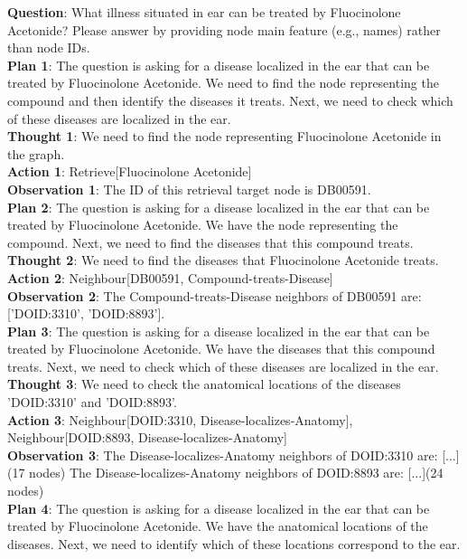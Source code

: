 \documentclass[11pt]{article}
\begin{document}
\begin{tcolorbox}[colback=white!10!white, colframe=blue!30!black, title=True Case (Biomedical), boxrule=1pt, fontupper={\fontsize{8pt}{10pt}\selectfont}]
\justifying
\noindent
\textbf{Question}: What illness situated in ear can be treated by Fluocinolone Acetonide? Please answer by providing node main feature (e.g., names) rather than node IDs. \\
\textbf{Plan 1}: The question is asking for a disease localized in the ear that can be treated by Fluocinolone Acetonide. We need to find the node representing the compound and then identify the diseases it treats. Next, we need to check which of these diseases are localized in the ear.\\
\textbf{Thought 1}: We need to find the node representing Fluocinolone Acetonide in the graph.\\
\textbf{Action 1}: Retrieve[Fluocinolone Acetonide]\\
\textbf{Observation 1}: The ID of this retrieval target node is DB00591. \\
\textbf{Plan 2}: The question is asking for a disease localized in the ear that can be treated by Fluocinolone Acetonide. We have the node representing the compound. Next, we need to find the diseases that this compound treats.\\
\textbf{Thought 2}: We need to find the diseases that Fluocinolone Acetonide treats.\\
\textbf{Action 2}: Neighbour[DB00591, Compound-treats-Disease]\\
\textbf{Observation 2}: The Compound-treats-Disease neighbors of DB00591 are: ['DOID:3310', 'DOID:8893']. \\
\textbf{Plan 3}: The question is asking for a disease localized in the ear that can be treated by Fluocinolone Acetonide. We have the diseases that this compound treats. Next, we need to check which of these diseases are localized in the ear.\\
\textbf{Thought 3}: We need to check the anatomical locations of the diseases 'DOID:3310' and 'DOID:8893'.\\
\textbf{Action 3}: Neighbour[DOID:3310, Disease-localizes-Anatomy], Neighbour[DOID:8893, Disease-localizes-Anatomy]\\
\textbf{Observation 3}: The Disease-localizes-Anatomy neighbors of DOID:3310 are: [...](17 nodes) The Disease-localizes-Anatomy neighbors of DOID:8893 are: [...](24 nodes) \\
\textbf{Plan 4}: The question is asking for a disease localized in the ear that can be treated by Fluocinolone Acetonide. We have the anatomical locations of the diseases. Next, we need to identify which of these locations correspond to the ear.\\

\end{tcolorbox}
\end{document}
